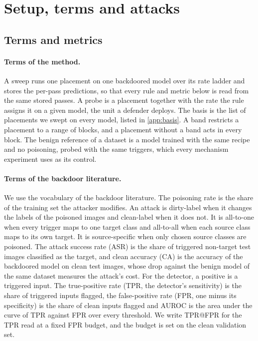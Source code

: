 
\section{Setup, terms and attacks}
\label{app:setup}

\subsection{Terms and metrics}
\label{app:glossary}

\paragraph{Terms of the method.}
A sweep runs one placement on one backdoored model over its rate ladder and stores the per-pass predictions, so that every rule and metric below is read from the same stored passes. A probe is a placement together with the rate the rule assigns it on a given model, the unit a defender deploys. The basis is the list of placements we swept on every model, listed in \cref{app:basis}. A band restricts a placement to a range of blocks, and a placement without a band acts in every block. The benign reference of a dataset is a model trained with the same recipe and no poisoning, probed with the same triggers, which every mechanism experiment uses as its control.

\paragraph{Terms of the backdoor literature.}
We use the vocabulary of the backdoor literature. The poisoning rate is the share of the training set the attacker modifies. An attack is dirty-label when it changes the labels of the poisoned images and clean-label when it does not. It is all-to-one when every trigger maps to one target class and all-to-all when each source class maps to its own target. It is source-specific when only chosen source classes are poisoned. The attack success rate (ASR) is the share of triggered non-target test images classified as the target, and clean accuracy (CA) is the accuracy of the backdoored model on clean test images, whose drop against the benign model of the same dataset measures the attack's cost. For the detector, a positive is a triggered input. The true-positive rate (TPR, the detector's sensitivity) is the share of triggered inputs flagged, the false-positive rate (FPR, one minus its specificity) is the share of clean inputs flagged and AUROC is the area under the curve of TPR against FPR over every threshold. We write TPR@FPR for the TPR read at a fixed FPR budget, and the budget is set on the clean validation set.



